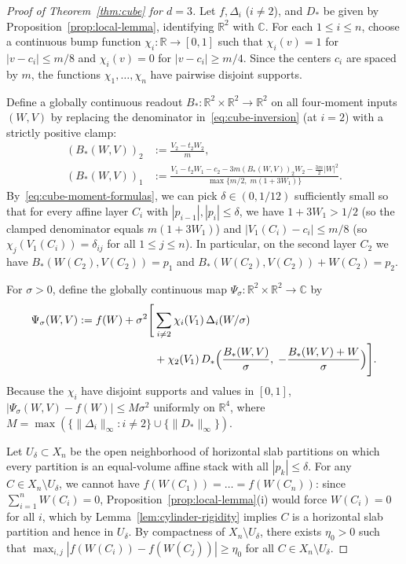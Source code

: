 \documentclass[11pt,a4paper]{amsart}
\numberwithin{equation}{section}
\theoremstyle{definition}
\newcommand{\R}{\mathbb{R}}
\newcommand{\C}{\mathbb{C}}
\begin{document}
\begin{proof}[Proof of Theorem~\ref{thm:cube} for $d = 3$]
Let $f, \Delta_i$ ($i \ne 2$), and $D_*$ be given by Proposition~\ref{prop:local-lemma}, identifying $\R^2$ with $\C$. For each $1 \le i \le n$, choose a continuous bump function $\chi_i : \R \to [0,1]$ such that $\chi_i(v) = 1$ for $|v - c_i| \le m/8$ and $\chi_i(v) = 0$ for $|v - c_i| \ge m/4$. Since the centers $c_i$ are spaced by $m$, the functions $\chi_1, \dots, \chi_n$ have pairwise disjoint supports.

Define a globally continuous readout $B_* : \R^2 \times \R^2 \to \R^2$ on all four-moment inputs $(W, V)$ by replacing the denominator in~\eqref{eq:cube-inversion} (at $i = 2$) with a strictly positive clamp:
\begin{align*}
(B_*(W, V))_2 &:= \frac{V_2 - t_2 W_2}{m}, \\
(B_*(W, V))_1 &:= \frac{V_1 - t_2 W_1 - c_2 - 3m (B_*(W, V))_2 W_2 - \frac{3m}{2}|W|^2}{\max\bigl\{m/2,\; m(1 + 3 W_1)\bigr\}}.
\end{align*}
By~\eqref{eq:cube-moment-formulas}, we can pick $\delta \in (0, 1/12)$ sufficiently small so that for every affine layer $C_i$ with $|p_{i-1}|, |p_i| \le \delta$, we have $1 + 3 W_1 > 1/2$ (so the clamped denominator equals $m(1+3W_1)$) and $|V_1(C_i) - c_i| \le m/8$ (so $\chi_j(V_1(C_i)) = \delta_{ij}$ for all $1 \le j \le n$). In particular, on the second layer $C_2$ we have $B_*(W(C_2), V(C_2)) = p_1$ and $B_*(W(C_2), V(C_2)) + W(C_2) = p_2$.

For $\sigma > 0$, define the globally continuous map $\Psi_\sigma : \R^2 \times \R^2 \to \C$ by
\[
\begin{aligned}
\Psi_\sigma(W, V) := f(W) + \sigma^2 \Bigg[ &\sum_{i \ne 2} \chi_i(V_1)\, \Delta_i(W/\sigma) \\
&+ \chi_2(V_1)\, D_*\Bigl(\frac{B_*(W,V)}{\sigma},\; -\frac{B_*(W,V) + W}{\sigma}\Bigr) \Bigg].
\end{aligned}
\]
Because the $\chi_i$ have disjoint supports and values in $[0,1]$, $|\Psi_\sigma(W, V) - f(W)| \le M \sigma^2$ uniformly on $\R^4$, where $M = \max(\{\|\Delta_i\|_\infty : i \ne 2\} \cup \{\|D_*\|_\infty\})$.

Let $U_\delta \subset X_n$ be the open neighborhood of horizontal slab partitions on which every partition is an equal-volume affine stack with all $|p_k| \le \delta$. For any $C \in X_n \setminus U_\delta$, we cannot have $f(W(C_1)) = \dots = f(W(C_n))$: since $\sum_{i=1}^n W(C_i) = 0$, Proposition~\ref{prop:local-lemma}(i) would force $W(C_i) = 0$ for all $i$, which by Lemma~\ref{lem:cylinder-rigidity} implies $C$ is a horizontal slab partition and hence in $U_\delta$. By compactness of $X_n \setminus U_\delta$, there exists $\eta_0 > 0$ such that $\max_{i,j} |f(W(C_i)) - f(W(C_j))| \ge \eta_0$ for all $C \in X_n \setminus U_\delta$.


\end{proof}
\end{document}

